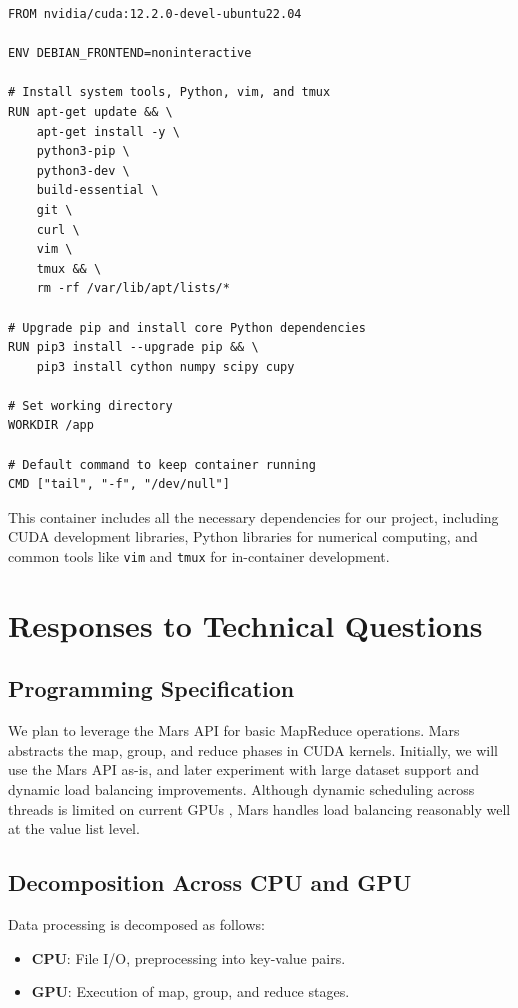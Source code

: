 \documentclass{article}
\begin{document}
\begin{verbatim}
FROM nvidia/cuda:12.2.0-devel-ubuntu22.04

ENV DEBIAN_FRONTEND=noninteractive

# Install system tools, Python, vim, and tmux
RUN apt-get update && \
    apt-get install -y \
    python3-pip \
    python3-dev \
    build-essential \
    git \
    curl \
    vim \
    tmux && \
    rm -rf /var/lib/apt/lists/*

# Upgrade pip and install core Python dependencies
RUN pip3 install --upgrade pip && \
    pip3 install cython numpy scipy cupy

# Set working directory
WORKDIR /app

# Default command to keep container running
CMD ["tail", "-f", "/dev/null"]
\end{verbatim}

This container includes all the necessary dependencies for our project, including CUDA development libraries, Python libraries for numerical computing, and common tools like \texttt{vim} and \texttt{tmux} for in-container development.



\section{Responses to Technical Questions}

\subsection{Programming Specification}
We plan to leverage the Mars API \cite{mars} for basic MapReduce operations. Mars abstracts the map, group, and reduce phases in CUDA kernels. Initially, we will use the Mars API as-is, and later experiment with large dataset support and dynamic load balancing improvements. Although dynamic scheduling across threads is limited on current GPUs \cite{dynamic_scheduling}, Mars handles load balancing reasonably well at the value list level.

\subsection{Decomposition Across CPU and GPU}
Data processing is decomposed as follows:
\begin{itemize}
    \item \textbf{CPU}: File I/O, preprocessing into key-value pairs.
    \item \textbf{GPU}: Execution of map, group, and reduce stages.
\end{itemize}
\end{document}
